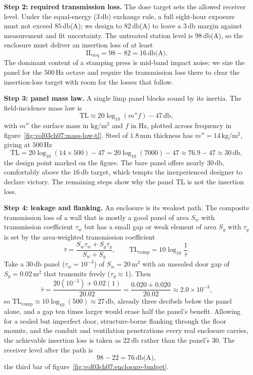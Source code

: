 \textbf{Step 2: required transmission loss.} The dose target sets the
allowed receiver level. Under the equal-energy ($3\,\si{\decibel}$)
exchange rule, a full eight-hour exposure must not exceed
$85\,\si{\decibel}$(A); we design to $82\,\si{\decibel}$(A) to leave a
$3\,\si{\decibel}$ margin against measurement and fit uncertainty. The
untreated station level is $98\,\si{\decibel}$(A), so the enclosure must
deliver an insertion loss of at least
\[
\text{IL}_{\text{req}} = 98 - 82 = 16\,\si{\decibel}\text{(A)}.
\]
The dominant content of a stamping press is mid-band impact noise; we
size the panel for the $500\,\si{\hertz}$ octave and require the
transmission loss there to clear the insertion-loss target with room for
the losses that follow.

\textbf{Step 3: panel mass law.} A single limp panel blocks sound by its
inertia. The field-incidence mass law is
\[
\text{TL} \approx 20\log_{10}(m'' f) - 47\,\si{\decibel},
\]
with $m''$ the surface mass in $\si{\kilogram\per\meter\squared}$ and
$f$ in $\si{\hertz}$, plotted across frequency in
figure~\ref{fig:vol03ch07:mass-law-tl}. Steel of $1.8\,\si{\milli\meter}$
thickness has $m''=14\,\si{\kilogram\per\meter\squared}$, giving at
$500\,\si{\hertz}$
\[
\text{TL} = 20\log_{10}(14\times 500) - 47
          = 20\log_{10}(7000) - 47 \approx 76.9 - 47 \approx 30\,\si{\decibel},
\]
the design point marked on the figure. The bare panel offers nearly
$30\,\si{\decibel}$, comfortably above the $16\,\si{\decibel}$ target,
which tempts the inexperienced designer to declare victory. The
remaining steps show why the panel TL is not the insertion loss.

\textbf{Step 4: leakage and flanking.} An enclosure is its weakest path.
The composite transmission loss of a wall that is mostly a good panel of
area $S_w$ with transmission coefficient $\tau_w$ but has a small gap or
weak element of area $S_g$ with $\tau_g$ is set by the area-weighted
transmission coefficient
\[
\bar\tau = \frac{S_w\tau_w + S_g\tau_g}{S_w + S_g},
\qquad \text{TL}_{\text{comp}} = 10\log_{10}\frac{1}{\bar\tau}.
\]
Take a $30\,\si{\decibel}$ panel ($\tau_w=10^{-3}$) of
$S_w=20\,\si{\meter\squared}$ with an unsealed door gap of
$S_g=0.02\,\si{\meter\squared}$ that transmits freely ($\tau_g\approx 1$).
Then
\[
\bar\tau = \frac{20(10^{-3}) + 0.02(1)}{20.02}
         = \frac{0.020 + 0.020}{20.02} \approx 2.0\times 10^{-3},
\]
so $\text{TL}_{\text{comp}}\approx 10\log_{10}(500)\approx 27\,\si{
\decibel}$, already three decibels below the panel alone, and a gap ten
times larger would erase half the panel's benefit. Allowing for a sealed
but imperfect door, structure-borne flanking through the floor mounts,
and the conduit and ventilation penetrations every real enclosure
carries, the achievable insertion loss is taken as
$22\,\si{\decibel}$ rather than the panel's $30$. The receiver level
after the path is
\[
98 - 22 = 76\,\si{\decibel}\text{(A)},
\]
the third bar of figure~\ref{fig:vol03ch07:enclosure-budget}.

